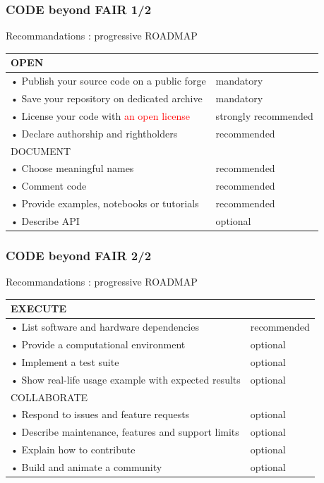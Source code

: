 \begin{frame}
\frametitle{CODE beyond FAIR 1/2}

Recommandations : progressive ROADMAP

\begin{tabular}{|l|l|}
  \hline
 \cellcolor{bl1} OPEN & \cellcolor{bl1}\\
    \hline 
• Publish your source code on a public forge & mandatory \\
• Save your repository on dedicated archive & mandatory \\
• License your code with \textcolor{red}{an open license} & strongly recommended \\
• Declare authorship and rightholders & recommended \\
  \hline 
 \cellcolor{bl1} DOCUMENT & \cellcolor{bl1}\\
    \hline 
• Choose meaningful names & recommended \\
• Comment code & recommended \\
• Provide examples, notebooks or tutorials & recommended \\
• Describe API & optional \\
  \hline 

\end{tabular}
\end{frame}






\begin{frame}
\frametitle{CODE beyond FAIR 2/2}

Recommandations : progressive ROADMAP

\begin{tabular}{|l|l|}
  \hline
\cellcolor{bl1} EXECUTE & \cellcolor{bl1}\\
    \hline 
• List software and hardware dependencies & recommended \\
• Provide a computational environment & optional \\
• Implement a test suite & optional \\
• Show real-life usage example with expected results & optional \\
  \hline 
\cellcolor{bl1}  COLLABORATE & \cellcolor{bl1}\\
    \hline 
• Respond to issues and feature requests & optional \\
• Describe maintenance, features and support limits & optional \\
• Explain how to contribute & optional \\
• Build and animate a community &  optional \\
  \hline 
\end{tabular}
\end{frame}


